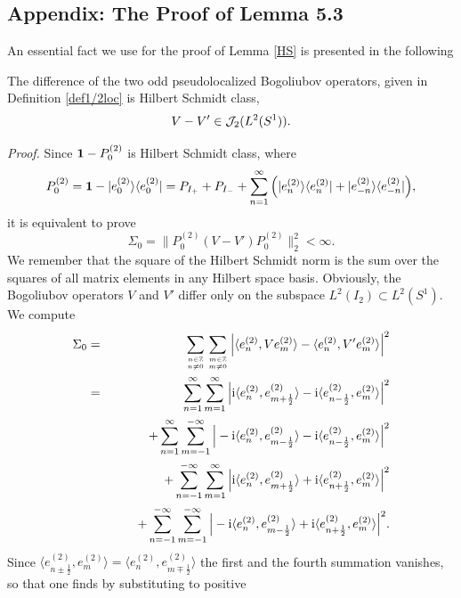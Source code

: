 \documentclass[10pt,a4paper]{article}
\begin{document}
\begin{appendix}
\section{Appendix: The Proof of Lemma 5.3}
An essential fact we use for the proof of Lemma
\ref{HS} is presented in the following
\begin{lemma}
The difference of the two odd pseudolocalized Bogoliubov
operators, given in Definition \ref{def1/2loc} is
Hilbert Schmidt class,
\begin{equation}
V-V' \in {\cal J}_2 (L^2(S^1)).
\end{equation}
\end{lemma}
{\it Proof.} Since ${\bf 1}-P_0^{(2)}$ is Hilbert Schmidt
class, where
\[ P_0^{(2)}= {\bf 1} - |e_0^{(2)} \rangle\langle e_0^{(2)}|
= P_{I_+}+P_{I_-} + \sum_{n=1}^\infty \Big( |e_n^{(2)}
\rangle\langle e_n^{(2)} | + |e_{-n}^{(2)} \rangle\langle
e_{-n}^{(2)}| \Big), \]
it is equivalent to prove
\[ \Sigma_0 = \| P_0^{(2)}(V-V')P_0^{(2)}
\|_2^2 < \infty. \]
We remember that the square of the Hilbert Schmidt norm
is the sum over the squares of all matrix elements in any
Hilbert space basis. Obviously, the Bogoliubov operators
$V$ and $V'$ differ only on the subspace
$L^2(I_2)\subset L^2(S^1)$. We compute
\begin{eqnarray*}
\Sigma_0 &=& \sum_{n\in\mathbb{Z}\atop n\neq 0}
\sum_{m\in\mathbb{Z}\atop m\neq 0} \Big|
\langle e_n^{(2)}, V e_m^{(2)} \rangle -
\langle e_n^{(2)}, V'e_m^{(2)} \rangle \Big|^2 \\
&=& \sum_{n=1}^\infty \sum_{m=1}^\infty \Big|
{\rm i} \langle e_n^{(2)}, e_{m+\frac{1}{2}}^{(2)} \rangle -
{\rm i} \langle e_{n-\frac{1}{2}}^{(2)},e_m^{(2)} \rangle
\Big|^2 \\
&& \qquad + \sum_{n=1}^\infty \sum_{m=-1}^{-\infty} \Big|
- {\rm i} \langle e_n^{(2)}, e_{m-\frac{1}{2}}^{(2)} \rangle
- {\rm i} \langle e_{n-\frac{1}{2}}^{(2)},e_m^{(2)} \rangle
\Big|^2 \\
&& \qquad + \sum_{n=-1}^{-\infty} \sum_{m=1}^\infty \Big|
{\rm i} \langle e_n^{(2)}, e_{m+\frac{1}{2}}^{(2)} \rangle
+ {\rm i} \langle e_{n+\frac{1}{2}}^{(2)},e_m^{(2)} \rangle
\Big|^2 \\
&& \qquad + \sum_{n=-1}^{-\infty} \sum_{m=-1}^{-\infty} \Big|
- {\rm i} \langle e_n^{(2)}, e_{m-\frac{1}{2}}^{(2)} \rangle
+ {\rm i} \langle e_{n+\frac{1}{2}}^{(2)},e_m^{(2)} \rangle
\Big|^2.
\end{eqnarray*}
Since $\langle e_{n\pm\frac{1}{2}}^{(2)}, e_m^{(2)}
\rangle = \langle e_n^{(2)}, e_{m\mp\frac{1}{2}}^{(2)}
\rangle$ the first and the fourth summation vanishes,
so that one finds by substituting to positive

\end{appendix}
\end{document}
